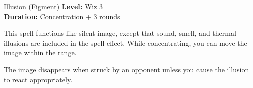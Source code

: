 {Illusion (Figment)}
{
	\textbf{Level:}
	Wiz 3\\
	\textbf{Duration:}
	Concentration + 3 rounds\\
}
{
	This spell functions like silent image, except that sound, smell, and thermal illusions are included in the spell effect. While concentrating, you can move the image within the range.

	The image disappears when struck by an opponent unless you cause the illusion to react appropriately.

}
